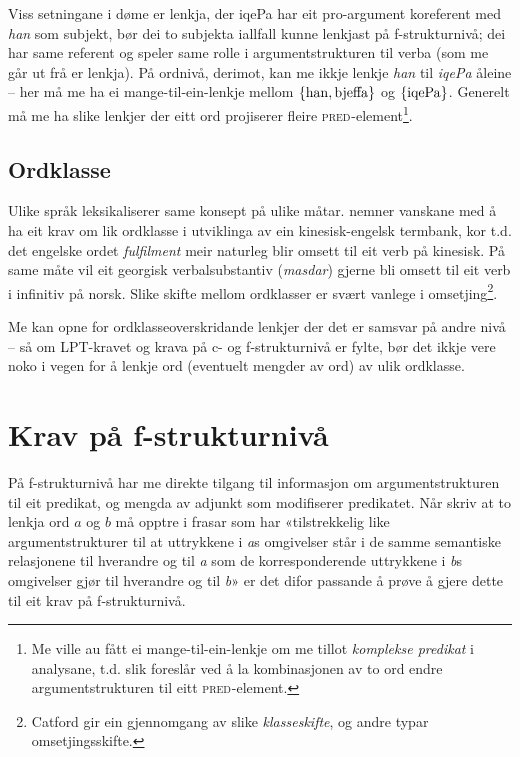 \documentclass[12pt,a4paper,oneside,draft]{report}
\newcommand{\F}[2]{\textsc{#1}\ensuremath{_{#2}}}
\newcommand{\PRED}{\F{pred}{}}
\begin{document}
Viss setningane i døme \Last er lenkja, der iqePa har eit
 pro\hyp{}argument koreferent med \emph{han} som subjekt, bør dei to
 subjekta iallfall kunne lenkjast på f\hyp{}strukturnivå; dei har same
 referent og speler same rolle i argumentstrukturen til verba (som me
 går ut frå er lenkja). På ordnivå, derimot, kan me ikkje lenkje \emph{han}
 til \emph{iqePa} åleine -- her må me ha ei mange-til-ein-lenkje mellom $\{
 \rm han, bjeffa \}$ og $\{ \rm iqePa \}$.  Generelt må me ha slike
 lenkjer der eitt ord projiserer fleire \PRED{}-element\footnote{Me ville au fått ei mange-til-ein-lenkje om me tillot
        \emph{komplekse predikat} i analysane, t.d. slik
        \citet{butt1998merger} foreslår ved å la kombinasjonen av to
        ord endre argumentstrukturen til eitt \PRED{}-element. }.

\subsection{Ordklasse}
\label{sec-3.5.1}

Ulike språk leksikaliserer same konsept på ulike
måtar. \citet[s.~3]{cheung2002scg} nemner vanskane med å ha eit krav
om lik ordklasse i utviklinga av ein kinesisk-engelsk termbank, kor
t.d. det engelske ordet \emph{fulfilment} meir naturleg blir omsett til eit
verb på kinesisk. På same måte vil eit georgisk verbalsubstantiv
(\emph{masdar}) gjerne bli omsett til eit verb i infinitiv på
norsk. Slike skifte mellom ordklasser er svært vanlege i
omsetjing\footnote{Catford \citep[1965, i][s.~61]{munday2001its} gir ein gjennomgang av
       slike \emph{klasseskifte}, og andre typar omsetjingsskifte. }.

Me kan opne for ordklasseoverskridande lenkjer der det er samsvar på
 andre nivå -- så om LPT-kravet og krava på c- og f\hyp{}strukturnivå
 er fylte, bør det ikkje vere noko i vegen for å lenkje ord (eventuelt
 mengder av ord) av ulik ordklasse.


\section{Krav på f\hyp{}strukturnivå}
\label{sec-3.6}

 
På f\hyp{}strukturnivå har me direkte tilgang til informasjon om
argumentstrukturen til eit predikat, og mengda av adjunkt som
modifiserer predikatet. Når \citet[s.~3]{thunes2003eal} skriv at to
lenkja ord $a$ og $b$ må opptre i frasar som har «tilstrekkelig like
argumentstrukturer til at uttrykkene i \emph{a}s omgivelser står i de
samme semantiske relasjonene til hverandre og til \emph{a} som de
korresponderende uttrykkene i \emph{b}s omgivelser gjør til hverandre
og til \emph{b}» er det difor passande å prøve å gjere dette til eit
krav på f\hyp{}strukturnivå.
\end{document}
